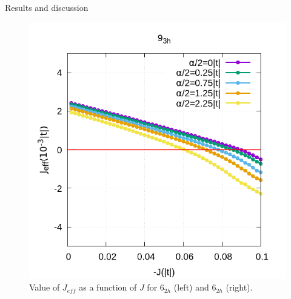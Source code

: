 \documentclass[12pt,twoside]{report}
\begin{document}
\begin{chapter}{Results and discussion}
\begin{figure}[h!]
		\begin{minipage}{0.4\textwidth}
			\includegraphics[scale=0.3]{Jeff_vs_J_ar3.png}
		\end{minipage}
		\caption{\label{fig_arj1} Value of $J_{eff}$ as a function of $J$ for 6$_{2h}$ (left) and 6$_{2h}$ (right). }
	\end{figure}
	

\end{chapter}
\end{document}
